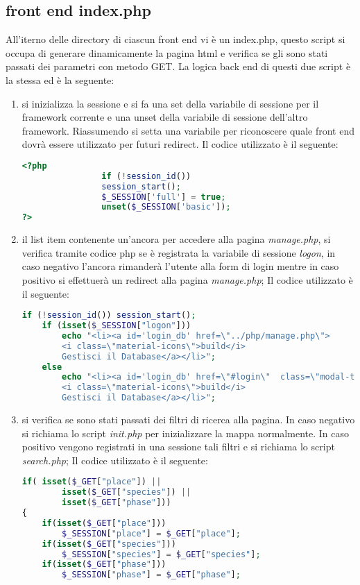 \subsection{front end index.php}
All'iterno delle directory di ciascun front end vi è un index.php, questo script si occupa di generare dinamicamente la pagina html e verifica se gli sono stati passati dei parametri con metodo GET. La logica back end di questi due script è la stessa ed è la seguente:
\begin{enumerate}
\item si inizializza la sessione e si fa una set della variabile di sessione per il framework corrente e una unset della variabile di sessione dell'altro framework. Riassumendo si setta una variabile per riconoscere quale front end dovrà essere utilizzato per futuri redirect. \newline Il codice utilizzato è il seguente:
\begin{lstlisting}[language=PHP , caption= Inizializzazione della sessione avendo scelto il front end full ]
<?php
				if (!session_id())
				session_start();
				$_SESSION['full'] = true;
				unset($_SESSION['basic']);
?>
\end{lstlisting}
\item il list item contenente un'ancora per accedere alla pagina \textit{manage.php}, si verifica tramite codice php se è registrata la variabile di sessione \textit{logon}, in caso negativo l'ancora rimanderà l'utente alla form di login mentre in caso positivo si effettuerà un redirect alla pagina \textit{manage.php};
\newline
Il codice utilizzato è il seguente:
\begin{lstlisting}[language=PHP]
if (!session_id()) session_start();  
	if (isset($_SESSION["logon"]))
		echo "<li><a id='login_db' href=\"../php/manage.php\">
		<i class=\"material-icons\">build</i>
		Gestisci il Database</a></li>"; 
	else
		echo "<li><a id='login_db' href=\"#login\"  class=\"modal-trigger\">
		<i class=\"material-icons\">build</i> 
		Gestisci il Database</a></li>"; 
\end{lstlisting}
\item si verifica se sono stati passati dei filtri di ricerca alla pagina. In caso negativo si richiama lo script \textit{init.php} per inizializzare la mappa normalmente. In caso positivo vengono registrati in una sessione tali filtri e si richiama lo script \textit{search.php};
Il codice utilizzato è il seguente:
\begin{lstlisting}[language=PHP]
if( isset($_GET["place"]) || 
		isset($_GET["species"]) || 
		isset($_GET["phase"]))
{
	if(isset($_GET["place"]))
		$_SESSION["place"] = $_GET["place"];
	if(isset($_GET["species"]))
		$_SESSION["species"] = $_GET["species"];
	if(isset($_GET["phase"]))
		$_SESSION["phase"] = $_GET["phase"];
	

\end{lstlisting}
\end{enumerate}
